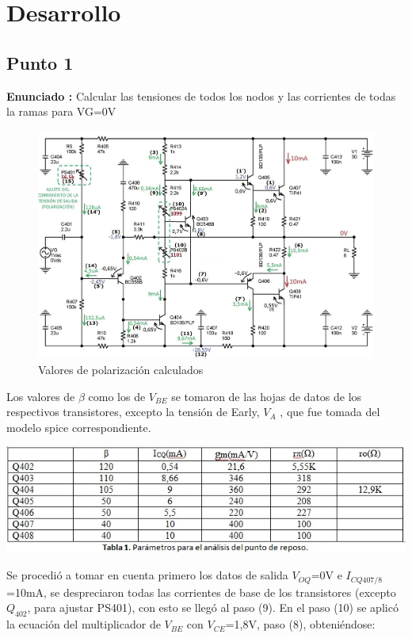\documentclass[12pt]{book}
\begin{document}
\newpage
\section{Desarrollo}
\subsection{Punto 1}
\textbf{Enunciado : } Calcular las tensiones de todos los nodos y las corrientes de todas la ramas para VG=0V\\[1cm]
\begin{figure}[H]
\centering
\includegraphics[scale=0.4]{figuras/1-valoresReposo.png}
\caption{Valores de polarización calculados}
\label{figura1}
\end{figure}
Los valores de $\beta$ como los de $V_{BE}$ se tomaron de las hojas de datos de los respectivos transistores, excepto la tensión de Early, $V_{A}$ , que fue tomada del modelo spice correspondiente.
\begin{center}
\includegraphics[scale=0.8]{figuras/tabla1.jpg}\\
\end{center}
Se procedió a tomar en cuenta primero los datos de salida $V_{OQ}$=0V e $I_{CQ407/8}$=10mA, se despreciaron todas las corrientes de base de los transistores (excepto $Q_{402}$, para ajustar PS401), con esto se llegó al paso (9). En el paso (10) se aplicó la ecuación del multiplicador de $V_{BE}$  con $V_{CE}$=1,8V, paso (8), obteniéndose:\\
\end{document}
